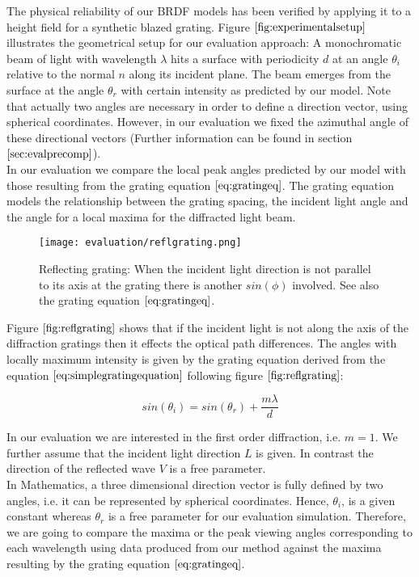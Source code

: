 The physical reliability of our BRDF models has been verified by applying it to a height field for a synthetic blazed grating. Figure $\ref{fig:experimentalsetup}$ illustrates the geometrical setup for our evaluation approach: A monochromatic beam of light with wavelength $\lambda$ hits a surface with periodicity $d$ at an angle $\theta_i$ relative to the normal $n$ along its incident plane. The beam emerges from the surface at the angle $\theta_r$ with certain intensity as predicted by our model. Note that actually two angles are necessary in order to define a direction vector, using spherical coordinates. However, in our evaluation we fixed the azimuthal angle of these directional vectors (Further information can be found in section $\ref{sec:evalprecomp}$). \\

In our evaluation we compare the local peak angles predicted by our model with those resulting from the grating equation $\ref{eq:gratingeq}$. The grating equation models the relationship between the grating spacing, the incident light angle and the angle for a local maxima for the diffracted light beam. 

\begin{figure}[H]
  \centering
  \texttt{[image: evaluation/reflgrating.png]}
  \caption[Reflective Grating]{Reflecting grating: When the incident light direction is not parallel to its axis at the grating there is another $sin(\phi)$ involved. See also the grating equation $\ref{eq:gratingeq}$.}
  \label{fig:reflgrating}
\end{figure}
\noindent
Figure $\ref{fig:reflgrating}$ shows that if the incident light is not along the axis of the diffraction gratings then it effects the optical path differences. The angles with locally maximum intensity is given by the grating equation derived from the equation $\ref{eq:simplegratingequation}$ following figure $\ref{fig:reflgrating}$: 

\begin{equation}
  sin(\theta_i) = sin(\theta_r) + \frac{m \lambda}{d}
\label{eq:gratingeq}
\end{equation}

In our evaluation we are interested in the first order diffraction, i.e. $m=1$. We further assume that the incident light direction $L$ is given. In contrast the direction of the reflected wave $V$ is a free parameter. \\

In Mathematics, a three dimensional direction vector is fully defined by two angles, i.e. it can be represented by spherical coordinates. Hence, $\theta_i$, is a given constant whereas $\theta_r$ is a free parameter for our evaluation simulation. Therefore, we are going to compare the maxima or the peak viewing angles corresponding to each wavelength using data produced from our method against the maxima resulting by the grating equation $\ref{eq:gratingeq}$.


